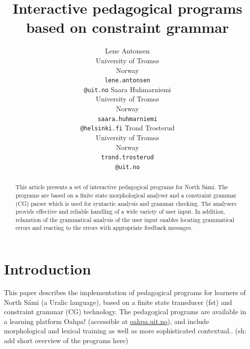 \documentclass[11pt]{article}
\begin{document}
\title{Interactive pedagogical programs based on constraint grammar}


\author{Lene Antonsen\\
  University of Tromsø\\
  Norway\\
  {\tt lene.antonsen}\\{\tt @uit.no}  \And
  Saara Huhmarniemi\\
  University of Tromsø\\
  Norway\\
  {\tt saara.huhmarniemi}\\{\tt @helsinki.fi}  \And
  Trond Trosterud\\
  University of Tromsø\\
  Norway\\
  {\tt trond.trosterud}\\{\tt @uit.no}}

 
\maketitle

\begin{abstract}
This article presents a set of interactive pedagogical programs for North Sámi. The programs are based on a finite state morphological analyser and  a constraint grammar (CG) parser which is used for syntactic analysis and grammar checking. The analysers provide effective and reliable handling of a wide variety of user input. In addition, relaxation of the grammatical analysis of the user input enables locating grammatical errors and reacting to the errors with appropriate feedback messages. 
\end{abstract}

\section{Introduction}
This paper describes the implementation of pedagogical programs for learners of North Sámi (a Uralic language), based on a finite state transducer (fst) and constraint grammar (CG) technology. %
The pedagogical programs are available in a learning platform Oahpa! (accessible at \url{oahpa.uit.no}), and include morphological and lexical training as well as more sophisticated contextual.. (sh: add short overview of the programs here) 
\end{document}
